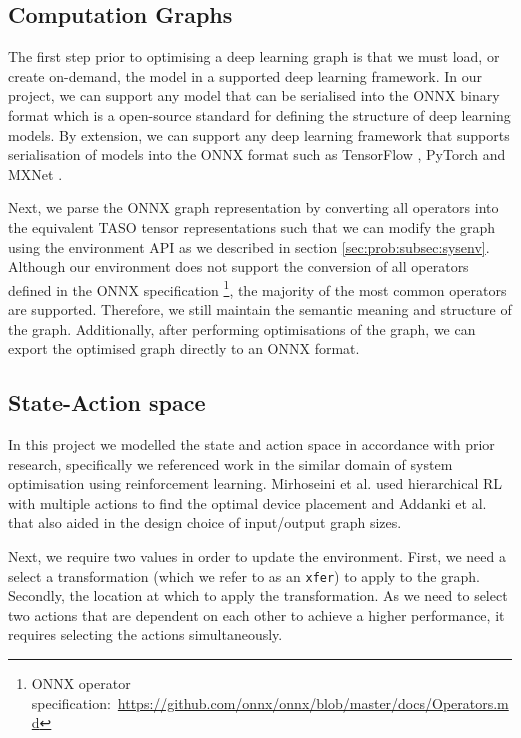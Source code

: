 \subsection{Computation Graphs}
The first step prior to optimising a deep learning graph is that we must load, or create on-demand, the model in a supported deep learning framework. In our project, we can support any model that can be serialised into the ONNX \cite{bai2019onnx} binary format which is a open-source standard for defining the structure of deep learning models. By extension, we can support any deep learning framework that supports serialisation of models into the ONNX format such as TensorFlow \cite{tensorflow2015-whitepaper}, PyTorch \cite{pytorch} and MXNet \cite{chen2015mxnet}.

Next, we parse the ONNX graph representation by converting all operators into the equivalent TASO tensor representations such that we can modify the graph using the environment API as we described in section \ref{sec:prob:subsec:sysenv}. Although our environment does not support the conversion of all operators defined in the ONNX specification \footnote{ONNX operator specification:~\url{https://github.com/onnx/onnx/blob/master/docs/Operators.md}}, the majority of the most common operators are supported. Therefore, we still maintain the semantic meaning and structure of the graph. Additionally, after performing optimisations of the graph, we can export the optimised graph directly to an ONNX format.

\subsection{State-Action space}
\label{sec:prob:subsec:sap}
In this project we modelled the state and action space in accordance with prior research, specifically we referenced work in the similar domain of system optimisation using reinforcement learning. Mirhoseini et al. \cite{mirhoseini2018hierarchical} used hierarchical RL with multiple actions to find the optimal device placement and Addanki et al. \cite{addanki2019placeto} that also aided in the design choice of input/output graph sizes.

Next, we require two values in order to update the environment. First, we need a select a transformation (which we refer to as an \texttt{xfer}) to apply to the graph. Secondly, the location at which to apply the transformation. As we need to select two actions that are dependent on each other to achieve a higher performance, it requires selecting the actions simultaneously.

